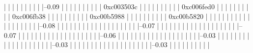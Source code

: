             |          |          |          |          |          |          |          |          |          |--0.09%
            |          |          |          |          |          |          |          |          |          |          0xc003503c
            |          |          |          |          |          |          |          |          |          |          0xc006fed0
            |          |          |          |          |          |          |          |          |          |          0xc006fb38
            |          |          |          |          |          |          |          |          |          |          0xc00b5988
            |          |          |          |          |          |          |          |          |          |          0xc00b5820
            |          |          |          |          |          |          |          |          |          |          
            |          |          |          |          |          |          |          |          |          |--0.08%
            |          |          |          |          |          |          |          |          |          |          
            |          |          |          |          |          |          |          |          |          |--0.07%
            |          |          |          |          |          |          |          |          |          |          
            |          |          |          |          |          |          |          |          |          |--0.07%
            |          |          |          |          |          |          |          |          |          |          
            |          |          |          |          |          |          |          |          |          |--0.06%
            |          |          |          |          |          |          |          |          |          |          
            |          |          |          |          |          |          |          |          |          |--0.03%
            |          |          |          |          |          |          |          |          |          |          
            |          |          |          |          |          |          |          |          |          |--0.03%
            |          |          |          |          |          |          |          |          |          |          
            |          |          |          |          |          |          |          |          |          |--0.03%
            |          |          |          |          |          |          |          |          |          |          
